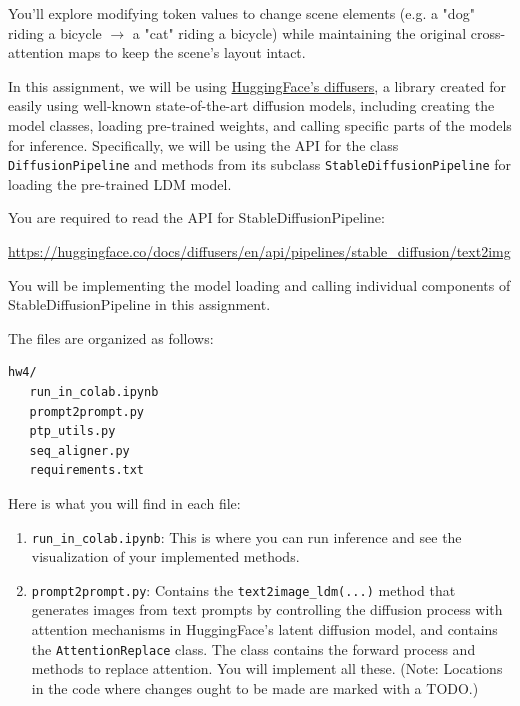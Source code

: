 \documentclass[11pt,addpoints,answers]{exam}
\begin{document}
\begin{questions}
You'll explore modifying token values to change scene elements (e.g. a "dog" riding a bicycle $\rightarrow$ a "cat" riding a bicycle) while maintaining the original cross-attention maps to keep the scene's layout intact.


In this assignment, we will be using \href{https://huggingface.co/docs/diffusers/main/en/index}{HuggingFace's diffusers}, a library created for easily using well-known state-of-the-art diffusion models, including creating the model classes, loading pre-trained weights, and calling specific parts of the models for inference. Specifically, we will be using the API for the class \lstinline{DiffusionPipeline} and methods from its subclass \lstinline{StableDiffusionPipeline} for loading the pre-trained LDM model. 

You are required to read the  API for StableDiffusionPipeline:

\url{https://huggingface.co/docs/diffusers/en/api/pipelines/stable_diffusion/text2img}

You will be implementing the model loading and calling individual components of StableDiffusionPipeline in this assignment.


The files are organized as follows:
\begin{verbatim}
hw4/
   run_in_colab.ipynb
   prompt2prompt.py
   ptp_utils.py
   seq_aligner.py
   requirements.txt
\end{verbatim}

Here is what you will find in each file:
\begin{enumerate}

    \item \lstinline{run_in_colab.ipynb}: This is where you can run inference and see the visualization of your implemented methods.
    
    \item \lstinline{prompt2prompt.py}: Contains the \lstinline{text2image_ldm(...)} method that generates images from text prompts by controlling the diffusion process with attention mechanisms in HuggingFace's latent diffusion model, and contains the \lstinline{AttentionReplace} class. The class contains the forward process and methods to replace attention. You will implement all these. (Note: Locations in the code where changes ought to be made are marked with a TODO.)


\end{enumerate}
\end{questions}
\end{document}
